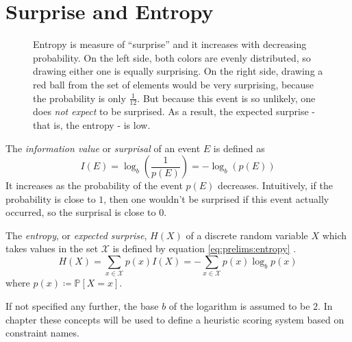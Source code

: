 		\clearpage
	
	\section{Surprise and Entropy}
	
		\begin{figure}[ht!]
			\centering
			
			\caption{Entropy is measure of \enquote{surprise} and it increases with decreasing probability. On the left side, both colors are evenly distributed, so drawing either one is equally surprising. On the right side, drawing a red ball from the set of elements would be very surprising, because the probability is only $\frac{1}{12}$. But because this event is so unlikely, one does \textit{not expect} to be surprised. As a result, the expected surprise - that is, the entropy - is low.}
			\label{figure:prelim:entropy}
		\end{figure}
	
		The \textit{information value} or \textit{surprisal} of an event $E$ is defined as
		\begin{equation}
			I(E) = \log_b \left( \frac{1}{p(E)} \right) = - \log_b \left( p(E) \right)
		\end{equation}
		It increases as the probability of the event $p(E)$ decreases.
		Intuitively, if the probability is close to $1$, then one wouldn't be surprised if this event actually occurred, so the surprisal is close to $0$.
		
		The \textit{entropy}, or \textit{expected surprise}, $H(X)$ of a discrete random variable $X$ which takes values in the set $\mathcal{X}$ is defined by equation \ref{eq:prelims:entropy} \cite{coverElementsInformationTheory2006}.
		\begin{equation}
		\label{eq:prelims:entropy}
			H(X) =  \sum_{x \in \mathcal{X}} p(x) I(X) = - \sum_{x \in \mathcal{X}} p(x) \log_b p(x)
		\end{equation}
		where $p(x) \coloneq \mathbb{P}[X = x]$.
		
		If not specified any further, the base $b$ of the logarithm is assumed to be $2$.
		In chapter  these concepts will be used to define a heuristic scoring system based on constraint names.
	